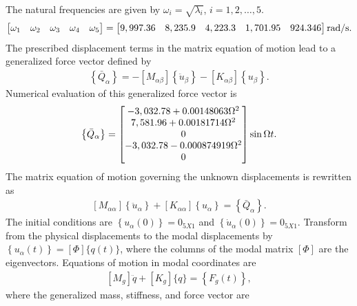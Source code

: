 \documentclass{AeroStructure-ERJohnson}
\begin{document}
\begin{example}
\begin{gather}
\end{gather}
The natural frequencies are given by $\omega_{i}=\sqrt{\lambda_{i}}$, $i=1,2, \ldots, 5$.
\begin{align}\label{ex18.5m}
\left[\begin{array}{@{}lllll@{}}\omega_{1} & \omega_{2} & \omega_{3} & \omega_{4} & \omega_{5}\end{array}\right]=\left[\begin{array}{@{}lllll@{}}9,997.36 & 8,235.9 & 4,223.3 & 1,701.95 & 924.346\end{array}\right] \mathrm{rad}/\mathrm{s}.
\end{align}
The prescribed displacement terms in the matrix equation of motion lead to a generalized force vector defined by
\begin{align}\label{ex18.5n}
\left\{\bar{Q}_{\alpha}\right\}=-\left[M_{\alpha \beta}\right]\left\{\ddot{u}_{\beta}\right\}-\left[K_{\alpha \beta}\right]\left\{u_{\beta}\right\}.
\end{align}
Numerical evaluation of this generalized force vector is
\begin{align}\label{ex18.5o}
\left\{\bar{Q}_{\alpha}\right\}=\left[\begin{array}{@{}c@{}}-3,032.78+0.00148063 \Omega^{2} \\7,581.96+0.00181714 \Omega^{2} \\0 \\-3,032.78-0.000874919 \Omega^{2} \\0\end{array}\right] \sin \Omega t.
\end{align}
The matrix equation of motion governing the unknown displacements is rewritten as
\begin{align}\label{ex18.5p}
\left[M_{\alpha \alpha}\right]\left\{\ddot{u}_{\alpha}\right\}+\left[K_{\alpha \alpha}\right]\left\{u_{\alpha}\right\}=\left\{\bar{Q}_{\alpha}\right\}.
\end{align}
The initial conditions are $\left\{u_{\alpha}(0)\right\}=0_{5 X 1}$ and $\left\{\dot{u}_{\alpha}(0)\right\}=0_{5 X 1}$. Transform from the physical displacements to the modal displacements by $\left\{u_{\alpha}(t)\right\}=[\Phi]\{q(t)\}$, where the columns of the modal matrix $[\Phi]$ are the eigenvectors. Equations of motion in modal coordinates are
\begin{align}\label{ex18.5q}
\left[M_{g}\right] \ddot{q}+\left[K_{g}\right]\{q\}=\left\{F_{g}(t)\right\},
\end{align}
where the generalized mass, stiffness, and force vector are

\end{example}
\end{document}
